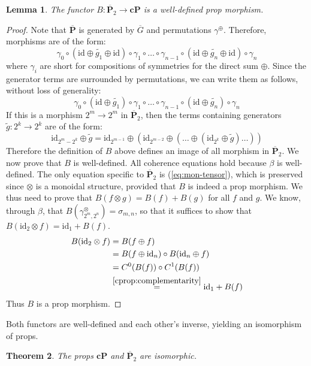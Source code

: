 \documentclass[a4paper]{article}
\theoremstyle{plain}
\newtheorem{theorem}{Theorem}
\newtheorem{lemma}[theorem]{Lemma}
\theoremstyle{definition}
\newcommand{\ccat}[1]{\mathbf{c #1}}
\newcommand{\scat}[1]{\mathbf{\ovl{#1}}}
\newcommand{\tcat}[1]{\mathbf{\ovl{#1}}_2}
\newcommand{\symtimes}{\gamma^\otimes}
\newcommand{\symplus}{\gamma^\oplus}
\newcommand{\iid}{\mathrm{id}}
\newcommand{\ovl}[1]{\overline{#1}}
\begin{document}
\begin{lemma}\label{lem:b-def}
	The functor $B \colon \tcat P \to \ccat P$ is a well-defined prop morphism.
\end{lemma}
\begin{proof}
	Note that $\scat P$ is generated by $\ovl G$ and permutations
	$\symplus$. Therefore, morphisms are of the form:
	\[
		\gamma_0 \circ (\iid \oplus \widetilde{g_1} \oplus \iid) \circ
		\gamma_1 \circ \dots \circ \gamma_{n-1} \circ (\iid \oplus
		\widetilde{g_n} \oplus \iid) \circ \gamma_n
	\]
	where $\gamma_i$ are short for compositions of symmetries for the direct
	sum $\oplus$. Since the generator terms are surrounded by permutations, we
	can write them as follows, without loss of generality:
	\[
		\gamma_0 \circ (\iid \oplus \widetilde{g_1}) \circ \gamma_1 \circ \dots
		\circ \gamma_{n-1} \circ (\iid \oplus \widetilde{g_n}) \circ \gamma_n
	\]
	If this is a morphism $2^m \to 2^m$ in $\tcat P$, then the terms containing
	generators $\widetilde g \colon 2^k \to 2^k$ are of the form:
	\[
		\iid_{2^m - 2^k} \oplus \widetilde g
		=
		\iid_{2^{m-1}} \oplus (\iid_{2^{m-2}} \oplus (\dots \oplus (\iid_{2^k} \oplus \widetilde g) \dots ))
	\]
	Therefore the definition of $B$ above defines an image of all morphism in
	$\tcat P$. We now prove that $B$ is well-defined. All coherence equations
	hold because $\beta$ is well-defined. The only equation specific to $\scat
	P_2$ is (\ref{eq:mon-tensor}), which is preserved since $\otimes$
	is a monoidal structure, provided that $B$ is indeed a prop morphism. We
	thus need to prove that $B(f \otimes g) =
	B(f) + B(g)$ for all $f$ and $g$. We know, through $\beta$, that $B(\symtimes_{2^m,2^n}) =
	\sigma_{m,n}$, so that it suffices to show that $B(\iid_2 \otimes
	f) = \iid_1 + B(f)$.
	\begin{align*}
		B(\iid_2 \otimes f)
		&= B(f \oplus f) \\
		&= B(f \oplus \iid_n) \circ B(\iid_n \oplus f) \\
		&= C^0(B(f)) \circ C^1(B(f)) \\
		&\stackrel{\ref{cprop:complementarity}}{=} \iid_1 + B(f)
	\end{align*}
	Thus $B$ is a prop morphism.
\end{proof}

Both functors are well-defined and each other's inverse, yielding an isomorphism of props.

\begin{theorem}
	\label{th:cp-iso}
	The props $\ccat P$ and $\tcat P$ are isomorphic.
\end{theorem}
\end{document}
